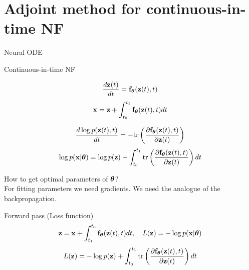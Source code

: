 \section{Adjoint method for continuous-in-time NF}
\begin{frame}{Neural ODE}
	\begin{block}{Continuous-in-time NF}
		{\small
		\begin{minipage}[t]{0.4\columnwidth}
			\[
	 			 \frac{d \mathbf{z}(t)}{dt} = \mathbf{f}_{\boldsymbol{\theta}}(\mathbf{z}(t), t) 	 
	 		\]
	 		\[
	 			 \mathbf{x} = \mathbf{z} + \int_{t_0}^{t_1} \mathbf{f}_{\boldsymbol{\theta}}(\mathbf{z}(t), t) dt 
			\]
		\end{minipage}%
		\begin{minipage}[t]{0.6\columnwidth}
			\vspace{-0.4cm}
			\[
					\frac{d \log p(\mathbf{z}(t), t)}{d t} = - \text{tr} \left( \frac{\partial \mathbf{f}_{\boldsymbol{\theta}}(\mathbf{z}(t), t)}{\partial \mathbf{z}(t)} \right) 
	 		\]
	 		\[
					\log p(\mathbf{x} | \boldsymbol{\theta}) = \log p(\mathbf{z}) - \int_{t_0}^{t_1} \text{tr} \left( \frac{\partial \mathbf{f}_{\boldsymbol{\theta}}(\mathbf{z}(t), t)}{\partial \mathbf{z}(t)} \right) dt
			\]
		\end{minipage}
		}
	\end{block}
	How to get optimal parameters of $\boldsymbol{\theta}$? \\
	
	For fitting parameters we need gradients. We need the analogue of the backpropagation.
	\begin{block}{Forward pass (Loss function)}
		\vspace{-0.3cm}
		\[
			\mathbf{z} = \mathbf{x} + \int_{t_1}^{t_0} \mathbf{f}_{\boldsymbol{\theta}}(\mathbf{z}(t), t) dt, \quad L(\mathbf{z}) = - \log p(\mathbf{x} | \boldsymbol{\theta})
		\]
		\[
			L(\mathbf{z}) = - \log p(\mathbf{z}) + \int_{t_0}^{t_1} \text{tr} \left( \frac{\partial \mathbf{f}_{\boldsymbol{\theta}}(\mathbf{z}(t), t)}{\partial \mathbf{z}(t)} \right) dt
		\]
	\end{block}
\end{frame}
